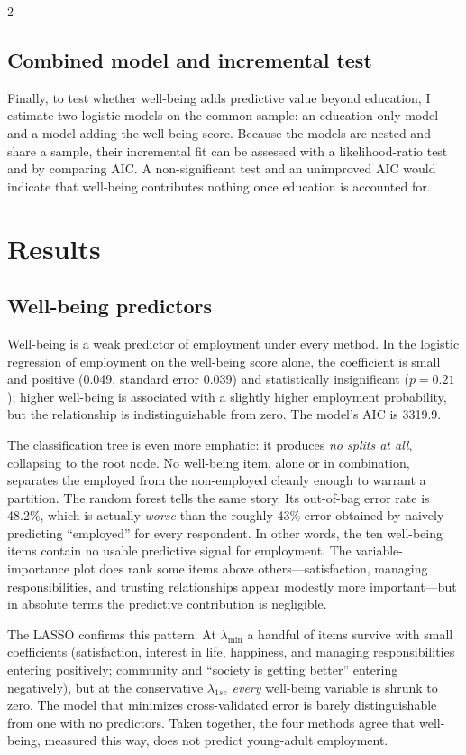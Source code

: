 \documentclass[
  11pt,
]{article}
\begin{document}
\begin{multicols}{2}
\subsection{Combined model and incremental test}
Finally, to test whether well-being adds predictive value beyond education, I estimate two logistic models on the common sample: an education-only model and a model adding the well-being score. Because the models are nested and share a sample, their incremental fit can be assessed with a likelihood-ratio test and by comparing AIC. A non-significant test and an unimproved AIC would indicate that well-being contributes nothing once education is accounted for.

\section{Results}

\subsection{Well-being predictors}
Well-being is a weak predictor of employment under every method. In the logistic regression of employment on the well-being score alone, the coefficient is small and positive (0.049, standard error 0.039) and statistically insignificant ($p = 0.21$); higher well-being is associated with a slightly higher employment probability, but the relationship is indistinguishable from zero. The model's AIC is 3319.9.

The classification tree is even more emphatic: it produces \emph{no splits at all}, collapsing to the root node. No well-being item, alone or in combination, separates the employed from the non-employed cleanly enough to warrant a partition. The random forest tells the same story. Its out-of-bag error rate is 48.2\%, which is actually \emph{worse} than the roughly 43\% error obtained by naively predicting ``employed'' for every respondent. In other words, the ten well-being items contain no usable predictive signal for employment. The variable-importance plot does rank some items above others---satisfaction, managing responsibilities, and trusting relationships appear modestly more important---but in absolute terms the predictive contribution is negligible.

The LASSO confirms this pattern. At $\lambda_{\min}$ a handful of items survive with small coefficients (satisfaction, interest in life, happiness, and managing responsibilities entering positively; community and ``society is getting better'' entering negatively), but at the conservative $\lambda_{1se}$ \emph{every} well-being variable is shrunk to zero. The model that minimizes cross-validated error is barely distinguishable from one with no predictors. Taken together, the four methods agree that well-being, measured this way, does not predict young-adult employment.


\end{multicols}
\end{document}
